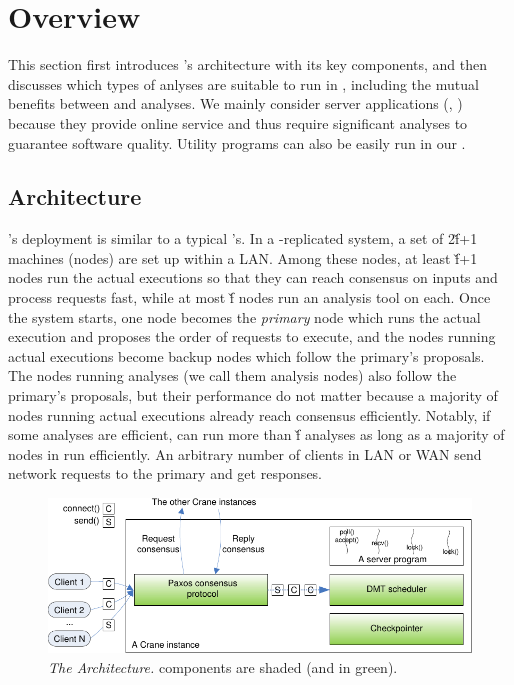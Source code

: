 \section{\xxx Overview} \label{sec:overview}

This section first introduces \xxx's architecture with its key components, and 
then discusses which types of anlyses are suitable to run in \xxx, including 
the mutual benefits between \xxx and analyses. We mainly consider server 
applications (\eg, \clamav) because they provide online service and thus 
require significant analyses to guarantee software quality. Utility programs 
can also be easily run in our \xxx.

\subsection{Architecture} \label{sec:arch}

\xxx's deployment is similar to a typical \smr's. In a \xxx-replicated
system, a set of 2\v{f}+1 machines (nodes) are set up within a LAN. Among these 
nodes, at least \v{f}+1 nodes run the actual executions so that 
they can reach consensus on inputs and process requests fast, while at most 
\v{f} nodes run an analysis tool on each. Once the \xxx system starts, 
one node becomes the \emph{primary} node which runs the actual execution and 
proposes the order of requests to execute, and the nodes running actual 
executions become backup nodes which follow the primary's proposals. The nodes 
running analyses (we call them analysis nodes) also follow the primary's 
proposals, but their performance do not matter because a majority of nodes 
running actual executions already reach consensus efficiently. Notably, if some 
analyses are efficient, \xxx can run more than \v{f} analyses as long as a 
majority of nodes in \xxx run efficiently. An arbitrary number of clients in 
LAN or WAN send network requests to the primary and get responses. 


\begin{figure}[t]
\vspace{.20in}
\centering
\includegraphics[width=.5\textwidth]{figures/arch}
\vspace{-.20in}
\caption{{\em The \xxx Architecture.} \xxx components are shaded (and in
  green).} \label{fig:arch}
\vspace{-.05in}
\end{figure}

